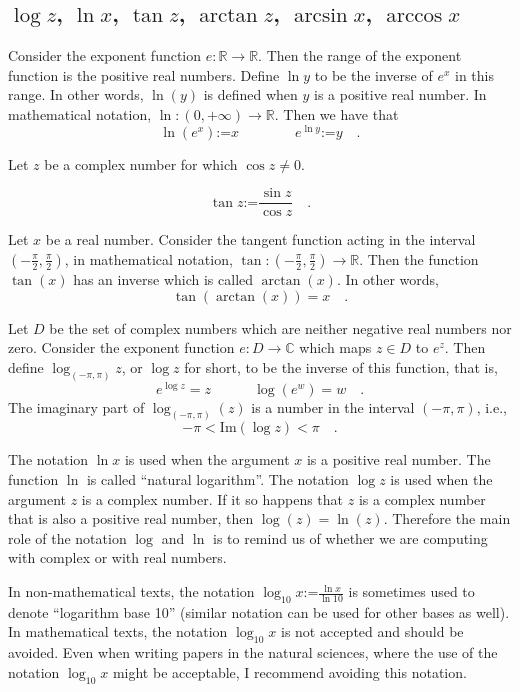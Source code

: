 \documentclass[12pt]{book}
\renewcommand{\Im}{\mathrm{Im}}
\newcommand{\eqdef}{\textbf{:=}}
\newcommand{\importantFormula}[1]{\begin{equation} \boxed{#1} \end{equation}}
\begin{document}
\subsection{$\log z$, $\ln x$, $\tan z$, $\arctan z$, $\arcsin x$, $\arccos x$}
Consider the exponent function $e: \mathbb R \to \mathbb R$. Then the range of the exponent function is the positive real numbers. Define $\ln y$ to be the inverse of $e^x$ in this range. In other words, $\ln(y)$ is defined when $y$ is a positive real number. In mathematical notation, $\ln: (0,+\infty)\to \mathbb R$. Then we have that
\importantFormula{
\ln (e^x)\eqdef x\quad\quad \quad \quad  e^{\ln y}\eqdef y\quad .
}

Let $z$ be a complex number for which $\cos z\neq 0$. 

\importantFormula{
\tan z\eqdef \frac{\sin z}{\cos z}\quad .
}

Let $x$ be a real number. Consider the tangent function acting in the interval $(-\frac{\pi}{2}, \frac{\pi}{2})$, in mathematical notation, $\tan :(-\frac{\pi}{2}, \frac{\pi}{2})\to \mathbb R$. Then the function $\tan(x)$ has an inverse which is called $\arctan(x)$. In other words,
\[
\tan (\arctan(x))= x\quad .
\]

Let $D$ be the set of complex numbers which are neither negative real numbers nor zero. Consider the exponent function $e: D\to \mathbb C$ which maps $z\in D$ to $e^z$. Then define $\log_{(-\pi,\pi)} z$, or $\log z$ for short, to be the inverse of this function, that is,
\importantFormula{
e^{\log z} = z\quad \quad \quad \log (e^w)=w\quad .
}
The imaginary part of $\log_{(-\pi,\pi)}(z)$ is a number in the interval $(-\pi,\pi)$, i.e., 
\[
-\pi<\Im(\log z)<\pi\quad . 
\]

The notation $\ln x$  is used when the argument $x$ is a positive real number. The function $\ln$ is called ``natural logarithm''. The notation $\log z$ is used when the argument $z$ is a complex number. If it so happens that $z$ is a complex number that is also a positive real number, then $\log(z)=\ln(z)$. Therefore the main role of the notation $\log$ and $\ln$ is to remind us of whether we are computing with complex or with real numbers.

In non-mathematical texts, the notation $\log_{10} x\eqdef \frac{\ln x}{\ln 10}$ is sometimes used to denote ``logarithm base 10'' (similar notation can be used for other bases as well). In mathematical texts, the notation $\log_{10} x$ is not accepted and should be avoided. Even when writing papers in the natural sciences, where the use of the notation $\log_{10} x$ might be acceptable, I  recommend avoiding this notation.
\end{document}
